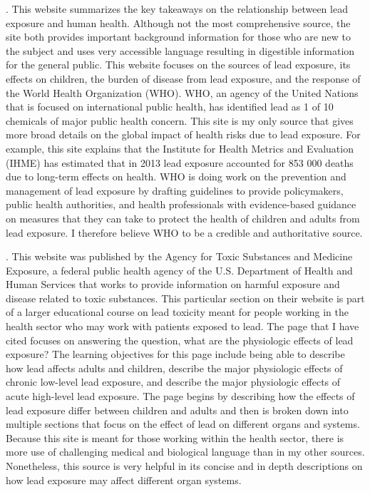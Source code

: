 \documentclass{article}
\begin{document}
. 
\bigskip
This website summarizes the key takeaways on the relationship between lead exposure and human health. Although not the most comprehensive source, the site both provides important background information for those who are new to the subject and uses very accessible language resulting in digestible information for the general public. This website focuses on the sources of lead exposure, its effects on children, the burden of disease from lead exposure, and the response of the World Health Organization (WHO). WHO, an agency of the United Nations that is focused on international public health, has identified lead as 1 of 10 chemicals of major public health concern. This site is my only source that gives more broad details on the global impact of health risks due to lead exposure. For example, this site explains that the Institute for Health Metrics and Evaluation (IHME) has estimated that in 2013 lead exposure accounted for 853 000 deaths due to long-term effects on health. WHO is doing work on the prevention and management of lead exposure by drafting guidelines to provide policymakers, public health authorities, and health professionals with evidence-based guidance on measures that they can take to protect the health of children and adults from lead exposure. I therefore believe WHO to be a credible and authoritative source. 


. 
\bigskip
This website was published by the Agency for Toxic Substances and Medicine Exposure, a federal public health agency of the U.S. Department of Health and Human Services that works to provide information on harmful exposure and disease related to toxic substances. This particular section on their website is part of a larger educational course on lead toxicity meant for people working in the health sector who may work with patients exposed to lead. The page that I have cited focuses on answering the question, what are the physiologic effects of lead exposure? The learning objectives for this page include being able to describe how lead affects adults and children, describe the major physiologic effects of chronic low-level lead exposure, and describe the major physiologic effects of acute high-level lead exposure. The page begins by describing how the effects of lead exposure differ between children and adults and then is broken down into multiple sections that focus on the effect of lead on different organs and systems. Because this site is meant for those working within the health sector, there is more use of challenging medical and biological language than in my other sources. Nonetheless, this source is very helpful in its concise and in depth descriptions on how lead exposure may affect different organ systems. 
\end{document}
